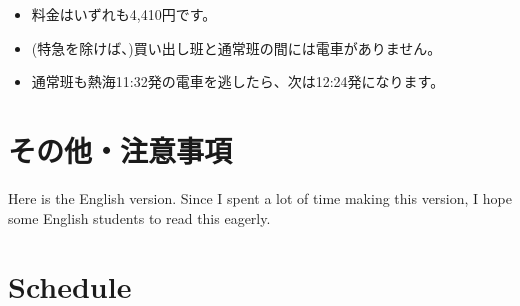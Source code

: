 \documentclass[unicode,a4paper,11pt]{ltjsarticle}
\begin{document}
\begin{itemize}
  \item
        料金はいずれも4,410円です。
  \item
        (特急を除けば、)買い出し班と通常班の間には電車がありません。
  \item
        通常班も熱海11:32発の電車を逃したら、次は12:24発になります。
\end{itemize}

\section{その他・注意事項}





\clearpage

\setcounter{section}{0}

Here is the English version. Since I spent a lot of time making this version, I hope some English students to read this eagerly.

\label{eng_page}

\section{Schedule}
\end{document}
